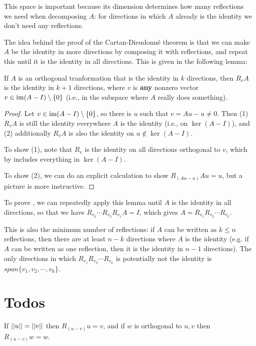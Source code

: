 This space is important because its dimension determines how many reflections we need when decomposing $A$: for directions in which $A$ already is the identity we don't need any reflections.

The idea behind the proof of the Cartan-Dieudonné theorem is that we can make $A$ be the identity in more directions by composing it with reflections, and repeat this until it is the identity in all directions.
This is given in the following lemma:

\begin{lemma}
  If $A$ is an orthogonal tranformation that is the identity in $k$ directions, then $R_v A$ is the identity in $k+1$ directions, where $v$ is \textbf{any} nonzero vector $v \in \operatorname{im}(A - I) \setminus \{ 0 \}$ (i.e., in the subspace where $A$ really does something).
\end{lemma}
\begin{proof}
  Let $v \in \operatorname{im}(A-I) \setminus \{ 0 \}$, so there is $u$ such that $v = Au - u \neq 0$.
  Then (1) $R_v A$ is still the identity everywhere $A$ is the identity (i.e., on $\ker(A - I)$), and (2) additionally $R_v A$ is also the identity on $u \notin \ker(A - I)$.

  To show (1), note that $R_v$ is the identity on all directions orthogonal to $v$, which by  includes everything in $\ker(A - I)$.

  To show (2), we can do an explicit calculation to show $R_{(Au - u)}Au = u$, but a picture is more instructive.
\end{proof}

To prove , we can repeatedly apply this lemma until $A$ is the identity in all directions, so that we have $R_{v_k} \cdots R_{v_2} R_{v_1} A = I$, which gives $A = R_{v_1} R_{v_2} \cdots R_{v_k}$.

This is also the minimum number of reflections: if $A$ can be written as $k \leq n$ reflections, then there are at least $n - k$ directions where $A$ is the identity (e.g. if $A$ can be written as one reflection, then it is the identity in $n - 1$ directions).
The only directions in which $R_{v_1} R_{v_2} \cdots R_{v_k}$ is potentially not the identity is $span \{v_1, v_2, \cdots, v_k\}$.

\section{Todos}

\begin{lemma}
  If $||u|| = ||v||$ then $R_{(u - v)}u = v$, and if $w$ is orthogonal to $u,v$ then $R_{(u-v)}w = w$.
\end{lemma}

